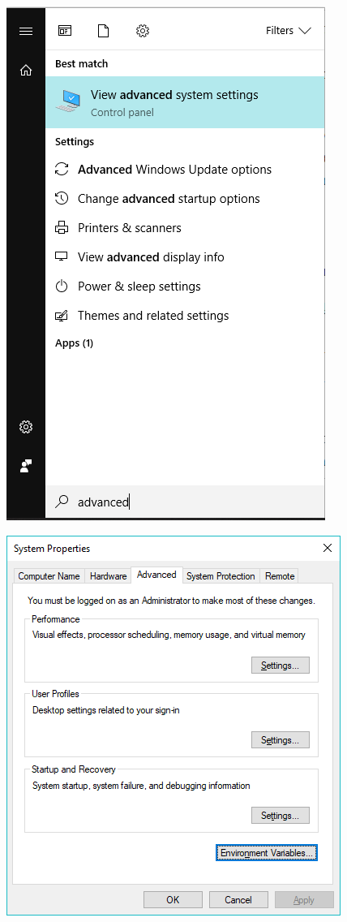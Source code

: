 \documentclass{article}
\begin{document}
\begin{figure}[h!]
  \centering
  \includegraphics[scale=0.75]{./imagenes/Configurar_path.png}
\end{figure}

\begin{figure}[h!]
  \centering
  \includegraphics[scale=0.75]{./imagenes/Configurar_path2.png}
\end{figure}
\clearpage
\end{document}
